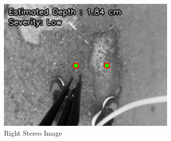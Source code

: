 \begin{figure}[htbp]
\begin{minipage}{0.32\textwidth}
		\includegraphics[width=\textwidth]{pothole raw right.png}
		\caption{Right Stereo Image}
		\label{fig:image3}
	\end{minipage}
\end{figure}